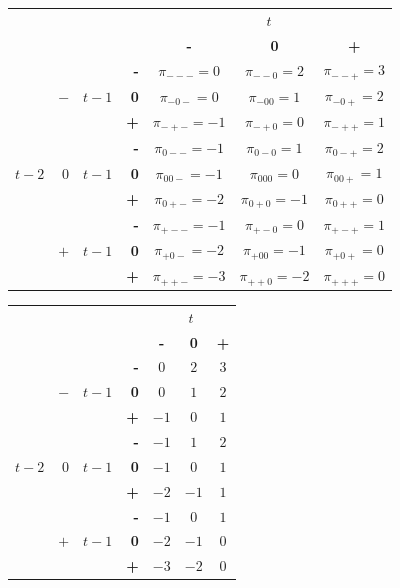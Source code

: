 \documentclass[12pt,a4paper,oneside]{book}
\begin{document}
\begin{center}
\begin{tabular}{r | r | r | r | c c c | }
 \multicolumn{3}{r}{} & \multicolumn{1}{r}{} &	\multicolumn{3}{c}{$t$} \\ \cline{5-7}
 \multicolumn{3}{r}{} & 		& \textbf{-} & \textbf{0} & \textbf{+} \\ \cline{2-2} \cline{4-7}
&&& \textbf{-}              & $\pi_{---}=0$ & $\pi_{--0}=2$ & $\pi_{--+}=3$ \\ 
&$-$ &$t-1$&\textbf{0}      & $\pi_{-0-}=0$	& $\pi_{-00}=1$ & $\pi_{-0+}=2$	\\
&&&\textbf{+}               & $\pi_{-+-}=-1$& $\pi_{-+0}=0$	& $\pi_{-++}=1$ \\ \cline{2-2} \cline{4-7}
&&&\textbf{-}               & $\pi_{0--}=-1$	& $\pi_{0-0}=1$	    & $\pi_{0-+}=2$ \\ 
$t-2$&$0$&$t-1$&\textbf{0}  & $\pi_{00-}=-1$	& $\pi_{000}=0$	    & $\pi_{00+}=1$	\\
&&&\textbf{+}               & $\pi_{0+-}=-2$	& $\pi_{0+0}=-1$    & $\pi_{0++}=0$ \\ \cline{2-2} \cline{4-7}
&&&\textbf{-}               & $\pi_{+--}=-1$	& $\pi_{+-0}=0$	    & $\pi_{+-+}=1$ \\ 
&$+$   &$t-1$ & \textbf{0}  & $\pi_{+0-}=-2$	& $\pi_{+00}=-1$    & $\pi_{+0+}=0$	\\
&&&\textbf{+}               & $\pi_{++-}=-3$	& $\pi_{++0}=-2$    & $\pi_{+++}=0$ \\ \cline{2-2} \cline{4-7}
		
\end{tabular}    
\end{center}



\begin{center}
\begin{tabular}{r | r | r | r | c c c | }
 \multicolumn{3}{r}{} & \multicolumn{1}{r}{} &	\multicolumn{3}{c}{$t$} \\ \cline{5-7}
 \multicolumn{3}{r}{} & 		& \textbf{-} & \textbf{0} & \textbf{+} \\ \cline{2-2} \cline{4-7}
&&& \textbf{-}              & $0$	& $2$	& $3$ \\ 
& $-$ &$t-1$ & \textbf{0}   & $0$	& $1$	& $2$	\\
&&& \textbf{+}              & $-1$ & $0$	& $1$ \\ \cline{2-2} \cline{4-7}
&&& \textbf{-}              & $-1$ & $1$	& $2$ \\ 
$t-2$&$0$&$t-1$&\textbf{0}  & $-1$	& $0$	& $1$	\\
&&&    \textbf{+}           & $-2$ & $-1$	& $1$ \\ \cline{2-2} \cline{4-7}
&&&    \textbf{-}           & $-1$ & $0$	& $1$ \\ 
&$+$   &$t-1$ & \textbf{0}  & $-2$	& $-1$	& $0$	\\
&&& \textbf{+}              & $-3$	& $-2$	& $0$ \\ \cline{2-2} \cline{4-7}
\end{tabular}    
\end{center}
\end{document}
